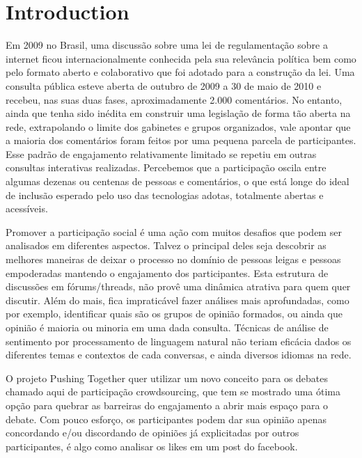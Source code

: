 \documentclass{llncs}
\begin{document}
\section{Introduction}
\label{sec:intro}
  Em 2009 no Brasil, uma discussão sobre uma lei de regulamentação sobre a internet
  ficou internacionalmente conhecida pela sua relevância política bem como
  pelo formato aberto e colaborativo que foi adotado para a construção da lei.
  Uma consulta pública esteve aberta de outubro de 2009 a 30 de maio de 2010 e recebeu,
  nas suas duas fases, aproximadamente 2.000 comentários.
  No entanto, ainda que tenha sido inédita em construir uma legislação de forma tão aberta
  na rede, extrapolando o limite dos gabinetes e grupos organizados, vale apontar
  que a maioria dos comentários foram feitos por uma pequena parcela de participantes.
  Esse padrão de engajamento relativamente limitado se repetiu em outras consultas
  interativas realizadas. Percebemos que a participação oscila entre
  algumas dezenas ou centenas de pessoas e comentários, o que está longe do ideal de
  inclusão esperado pelo uso das tecnologias adotas, totalmente abertas e acessíveis.

  Promover a participação social é uma ação com muitos desafios que podem
  ser analisados em diferentes aspectos. Talvez o principal deles seja descobrir
  as melhores maneiras de deixar o processo no domínio  de pessoas leigas e 
  pessoas empoderadas mantendo o engajamento dos participantes. Esta estrutura
  de discussões em fórums/threads, não provê uma dinâmica atrativa para
  quem quer discutir. Além do mais, fica impraticável fazer análises mais aprofundadas,
  como por exemplo, identificar quais são os grupos de opinião formados, ou ainda
  que opinião é maioria ou minoria em uma dada consulta. Técnicas de análise
  de sentimento por processamento de linguagem natural não teriam eficácia
  dados os diferentes temas e contextos de cada conversas, e ainda diversos
  idiomas na rede.

  O projeto Pushing Together quer utilizar um novo conceito para os debates
  chamado aqui de participação crowdsourcing, que tem se mostrado uma ótima opção
  para quebrar as barreiras do engajamento a abrir mais espaço para o debate. Com
  pouco esforço, os participantes podem dar sua opinião apenas concordando
  e/ou discordando de opiniões já explicitadas por outros participantes, é algo
  como analisar os likes em um post do facebook.
\end{document}
